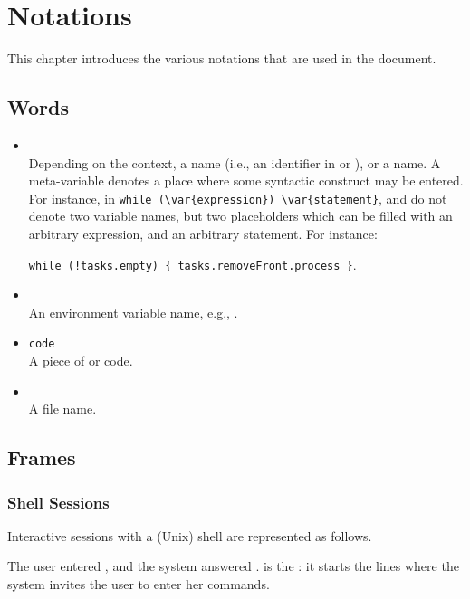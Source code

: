 \chapter{Notations}

This chapter introduces the various notations that are used in the
document.

\section{Words}

\begin{itemize}
\item {}\\
  Depending on the context, a  name (i.e., an identifier
  in \Cxx or \us), or a  name.  A meta-variable
  denotes a place where some syntactic construct may be entered.  For
  instance, in \lstinline|while (\var{expression}) \var{statement}|,
   and  do not denote two variable
  names, but two placeholders which can be filled with an arbitrary
  expression, and an arbitrary statement.  For instance:

  \lstinline|while (!tasks.empty) { tasks.removeFront.process }|.

\item {}\\
  An environment variable name, e.g., .
\item \lstinline|code|\\
  A piece of \us or \Cxx code.
\item {}\\
  A file name.
\end{itemize}

\section{Frames}

\subsection{Shell Sessions}
\label{sec:notations:shell}

Interactive sessions with a (Unix) shell are represented as follows.


The user entered , and the system answered
.  \samp{\$} is the : it starts the lines where
the system invites the user to enter her commands.

